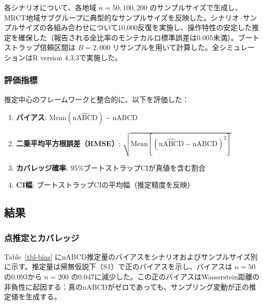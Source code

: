 \documentclass[
  a4paper,
  11pt]{ltjsarticle}
\providecommand{\tightlist}{%
  \setlength{\itemsep}{0pt}\setlength{\parskip}{0pt}}\usepackage{longtable,booktabs,array}
\begin{document}
各シナリオについて、各地域 \(n = 50, 100, 200\)
のサンプルサイズで生成し、MRCT地域サブグループに典型的なサンプルサイズを反映した。シナリオ--サンプルサイズの各組み合わせについて10,000反復を実施し、操作特性の安定した推定を確保した（報告される全比率のモンテカルロ標準誤差は0.005未満）。ブートストラップ信頼区間は
\(B = 2{,}000\) リサンプルを用いて計算した。全シミュレーションはR
version 4.3.3で実施した。

\subsubsection{評価指標}\label{ux8a55ux4fa1ux6307ux6a19}

推定中心のフレームワークと整合的に、以下を評価した：

\begin{enumerate}
\def\labelenumi{\arabic{enumi}.}
\tightlist
\item
  \textbf{バイアス}:
  \(\text{Mean}(\widehat{\text{nABCD}}) - \text{nABCD}\)
\item
  \textbf{二乗平均平方根誤差（RMSE）}:
  \(\sqrt{\text{Mean}[(\widehat{\text{nABCD}} - \text{nABCD})^2]}\)
\item
  \textbf{カバレッジ確率}: 95\%ブートストラップCIが真値を含む割合
\item
  \textbf{CI幅}: ブートストラップCIの平均幅（推定精度を反映）
\end{enumerate}

\subsection{結果}\label{ux7d50ux679c}

\subsubsection{点推定とカバレッジ}\label{ux70b9ux63a8ux5b9aux3068ux30abux30d0ux30ecux30c3ux30b8}

Table~\ref{tbl-bias}
にnABCD推定量のバイアスをシナリオおよびサンプルサイズ別に示す。推定量は帰無仮説下（S1）で正のバイアスを示し、バイアスは
\(n=50\) の0.093から \(n=200\)
の0.047に減少した。この正のバイアスはWasserstein距離の非負性に起因する：真のnABCDがゼロであっても、サンプリング変動が正の推定値を生成する。
\end{document}
